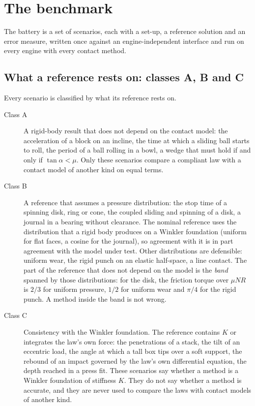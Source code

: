 \section{The benchmark}\label{sec:benchmark}


The battery is a set of scenarios, each with a set-up, a reference solution and an error
measure, written once against an engine-independent interface and run on every engine with every
contact method.

\subsection{What a reference rests on: classes A, B and C}\label{sec:classes}

Every scenario is classified by what its reference rests on.
\begin{description}
\item[Class A] A rigid-body result that does not depend on the contact model: the acceleration
  of a block on an incline, the time at which a sliding ball starts to roll, the period of a
  ball rolling in a bowl, a wedge that must hold if and only if $\tan\alpha < \mu$. Only these
  scenarios compare a compliant law with a contact model of another kind on equal terms.
\item[Class B] A reference that assumes a pressure distribution: the stop time of a spinning
  disk, ring or cone, the coupled sliding and spinning of a disk, a journal in a bearing without
  clearance. The nominal reference uses the distribution that a rigid body produces on a Winkler
  foundation (uniform for flat faces, a cosine for the journal), so agreement with it is in part
  agreement with the model under test. Other distributions are defensible: uniform wear, the
  rigid punch on an elastic half-space, a line contact. The part of the reference that does not
  depend on the model is the \emph{band} spanned by those distributions: for the disk, the
  friction torque over $\mu N R$ is $2/3$ for uniform pressure, $1/2$ for uniform wear and
  $\pi/4$ for the rigid punch. A method inside the band is not wrong.
\item[Class C] Consistency with the Winkler foundation. The reference contains $K$ or
  integrates the law's own force: the penetrations of a stack, the tilt of an eccentric load,
  the angle at which a tall box tips over a soft support, the rebound of an impact governed by
  the law's own differential equation, the depth reached in a press fit. These scenarios say
  whether a method is a Winkler foundation of stiffness $K$. They do not say whether a method is
  accurate, and they are never used to compare the laws with contact models of another kind.
\end{description}

